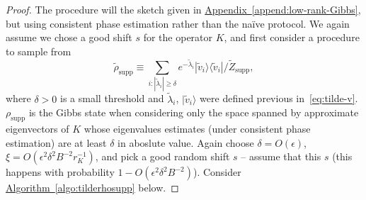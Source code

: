 \documentclass[a4paper,UKenglish,cleveref, autoref]{lipics-v2019}
\theoremstyle{remark}
\numberwithin{equation}{section}
\numberwithin{oracle}{section}
\numberwithin{remark}{section}
\newcommand{\algo}[1]{\hyperref[algo:#1]{Algorithm~\ref*{algo:#1}}}
\newcommand{\append}[1]{\hyperref[append:#1]{Appendix~\ref*{append:#1}}}
\newcommand{\ket}[1]{|#1\rangle}
\newcommand{\bra}[1]{\langle#1|}
\newcommand{\eps}{\varepsilon}
\def \eps {\epsilon}
\begin{document}
\begin{proof}
The procedure will the sketch given in \append{low-rank-Gibbs}, but using consistent phase estimation rather than the na{\"i}ve protocol. We again assume we chose a good shift $s$ for the operator $K$, and first consider a procedure to sample from
\begin{equation}
\tilde{\rho}_{\text{supp}} \equiv \sum_{i:|\tilde{\lambda}_i| \ge \delta} e^{-\tilde{\lambda}_i}\ket{\tilde{v}_i}\bra{\tilde{v}_i}/\widetilde{Z}_{\text{supp}},
\end{equation}
where $\delta > 0$ is a small threshold and $\tilde{\lambda}_i$, $\ket{\tilde{v}_i}$ were defined previous in~\eqref{eq:tilde-v}.  $\rho_{\text{supp}}$ is the Gibbs state when considering only the space spanned by approximate eigenvectors of $K$ whose eigenvalues estimates (under consistent phase estimation) are at least $\delta$ in aboslute value. Again choose $\delta = O(\eps)$, $\xi = O(\eps^2\delta^2 B^{-2}r_{K}^{-1})$, and pick a good random shift $s$ -- assume that this $s$  (this happens with probability $1 - O(\eps^2\delta^2B^{-2})$). Consider \algo{tilderhosupp} below.


\end{proof}
\end{document}
